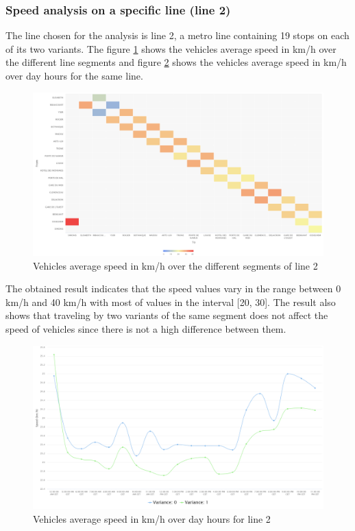\documentclass{article}
\begin{document}
\subsubsection{Speed analysis on a specific line (line 2)}

The line chosen for the analysis is line 2, a metro line containing 19 stops on each of its two variants. The figure \ref{fig:speed_2} shows the vehicles average speed in km/h over the different line segments and figure \ref{fig:speed_2_hour} shows the vehicles average speed in km/h over day hours for the same line.

 \begin{figure}[H]
    \centering
    \includegraphics[width=\textwidth]{images/speed_2.png} 
    \caption{Vehicles average speed in km/h over the different segments of line 2}
    \label{fig:speed_2}
\end{figure}

The obtained result indicates that the speed values vary in the range between 0 km/h and 40 km/h with most of values in the interval [20, 30]. The result also shows that traveling by two variants of the same segment does not affect the speed of vehicles since there is not a high difference between them.

 \begin{figure}[H]
    \centering
    \includegraphics[width=\textwidth]{images/speed_2_hour.png} 
    \caption{Vehicles average speed in km/h over day hours for line 2}
    \label{fig:speed_2_hour}
\end{figure}
\end{document}
